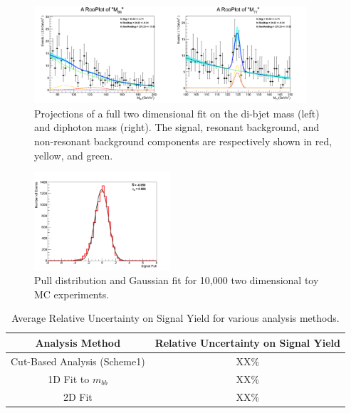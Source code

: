 \documentclass{cmspaper}
\begin{document}
\begin{figure}[h]
  \centering
  \includegraphics[width=0.9\textwidth]{figures/projectionFits_0.pdf}
  \caption{Projections of a full two dimensional fit on the di-bjet mass (left) and diphoton mass (right). The signal, resonant background, and non-resonant background components are respectively shown in red, yellow, and green.}
  \label{fig:twoDfullFit}
\end{figure}


\begin{figure}[h]
  \centering
  \includegraphics[width=0.45\textwidth]{figures/sigPullFitTwoD.pdf}
  \caption{Pull distribution and Gaussian fit for 10,000 two dimensional toy MC experiments.}
  \label{fig:twoDpullPlot}
\end{figure}



\begin{table}[!ht]
\begin{center} 
\begin{tabular}{|c|c|}
\hline 
Analysis Method                 &  Relative Uncertainty on Signal Yield \\  \hline
Cut-Based Analysis (Scheme1)    &  XX\%                                 \\  
1D Fit to $m_{bb}$              &  XX\%                                 \\  
2D Fit                          &  XX\%                                 \\  \hline
\end{tabular}
\caption{Average Relative Uncertainty on Signal Yield for various analysis methods. }
\label{tab:RelativeUncertaintyOnSignalYield}
\end{center}
\end{table}
 
\end{document}
